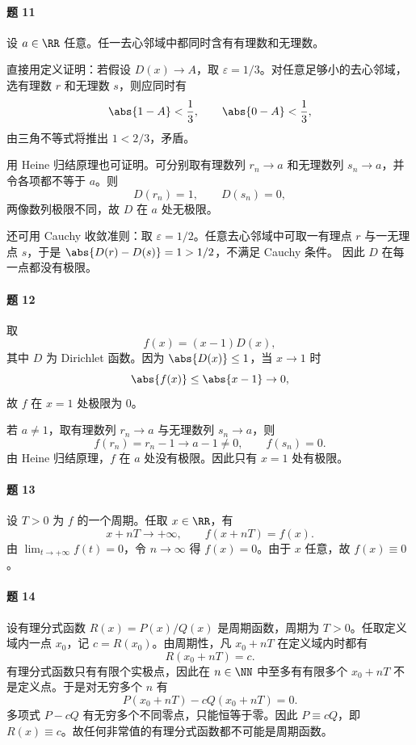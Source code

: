 \paragraph{题 11}
\begin{xsolution}
设 $a\in\RR$ 任意。任一去心邻域中都同时含有有理数和无理数。

直接用定义证明：若假设 $D(x)\to A$，取 $\varepsilon=1/3$。对任意足够小的去心邻域，选有理数 $r$ 和无理数 $s$，则应同时有
\[
  \abs{1-A}<\frac13,\qquad \abs{0-A}<\frac13,
\]
由三角不等式将推出 $1<2/3$，矛盾。

用 Heine 归结原理也可证明。可分别取有理数列 $r_n\to a$ 和无理数列 $s_n\to a$，并令各项都不等于 $a$。则
\[
  D(r_n)=1,\qquad D(s_n)=0,
\]
两像数列极限不同，故 $D$ 在 $a$ 处无极限。

还可用 Cauchy 收敛准则：取 $\varepsilon=1/2$。任意去心邻域中可取一有理点 $r$ 与一无理点 $s$，于是
$\abs{D(r)-D(s)}=1>1/2$，不满足 Cauchy 条件。
因此 $D$ 在每一点都没有极限。
\end{xsolution}

\paragraph{题 12}
\begin{xsolution}
取
\[
  f(x)=(x-1)D(x),
\]
其中 $D$ 为 Dirichlet 函数。因为 $\abs{D(x)}\leq1$，当 $x\to1$ 时
\[
  \abs{f(x)}\leq\abs{x-1}\to0,
\]
故 $f$ 在 $x=1$ 处极限为 0。

若 $a\ne1$，取有理数列 $r_n\to a$ 与无理数列 $s_n\to a$，则
\[
  f(r_n)=r_n-1\to a-1\ne0,
  \qquad f(s_n)=0.
\]
由 Heine 归结原理，$f$ 在 $a$ 处没有极限。因此只有 $x=1$ 处有极限。
\end{xsolution}

\paragraph{题 13}
\begin{xsolution}
设 $T>0$ 为 $f$ 的一个周期。任取 $x\in\RR$，有
\[
  x+nT\to+\infty,\qquad f(x+nT)=f(x).
\]
由 $\lim_{t\to+\infty}f(t)=0$，令 $n\to\infty$ 得 $f(x)=0$。由于 $x$ 任意，故 $f(x)\equiv0$。
\end{xsolution}

\paragraph{题 14}
\begin{xsolution}
设有理分式函数 $R(x)=P(x)/Q(x)$ 是周期函数，周期为 $T>0$。任取定义域内一点 $x_0$，记 $c=R(x_0)$。由周期性，凡 $x_0+nT$ 在定义域内时都有
\[
  R(x_0+nT)=c.
\]
有理分式函数只有有限个实极点，因此在 $n\in\NN$ 中至多有有限多个 $x_0+nT$ 不是定义点。于是对无穷多个 $n$ 有
\[
  P(x_0+nT)-cQ(x_0+nT)=0.
\]
多项式 $P-cQ$ 有无穷多个不同零点，只能恒等于零。因此 $P\equiv cQ$，即 $R(x)\equiv c$。故任何非常值的有理分式函数都不可能是周期函数。
\end{xsolution}

